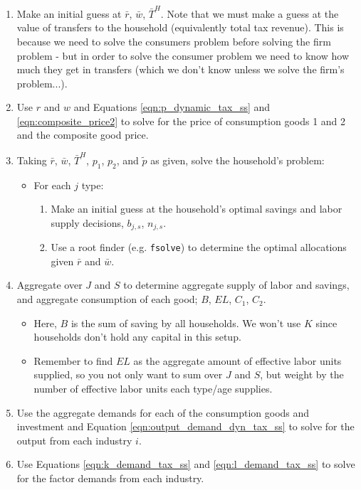\documentclass[letterpaper,12pt]{article}
\theoremstyle{definition}
\begin{document}
\begin{spacing}{1.5}
\begin{enumerate}
\item Make an initial guess at $\bar{r}$, $\bar{w}$, $\bar{T}^{H}$.  Note that we must make a guess at the value of transfers to the household (equivalently total tax revenue).  This is because we need to solve the consumers problem before solving the firm problem - but in order to solve the consumer problem we need to know how much they get in transfers (which we don't know unless we solve the firm's problem...).
\item Use $r$ and $w$ and Equations \ref{eqn:p_dynamic_tax_ss} and \ref{eqn:composite_price2} to solve for the price of consumption goods 1 and 2 and the composite good price.
\item Taking $\bar{r}$, $\bar{w}$, $\bar{T}^{H}$, $p_{1}$, $p_{2}$, and $\tilde{p}$ as given, solve the household's problem:
	\begin{itemize}
	\item For each $j$ type:
		\begin{enumerate}
		\item Make an initial guess at the household's optimal savings and labor supply decisions, $b_{j,s}$, $n_{j,s}$.
		\item Use a root finder (e.g. \texttt{fsolve}) to determine the optimal allocations given $\bar{r}$ and $\bar{w}$.
		\end{enumerate}
	\end{itemize}
\item Aggregate over $J$ and $S$ to determine aggregate supply of labor and savings, and aggregate consumption of each good; $B$, $EL$, $C_{1}$, $C_{2}$.
	\begin{itemize}
	\item Here, $B$ is the sum of saving by all households.  We won't use $K$ since households don't hold any capital in this setup.
	\item Remember to find $EL$ as the aggregate amount of effective labor units supplied, so you not only want to sum over $J$ and $S$, but weight by the number of effective labor units each type/age supplies.
	\end{itemize}
\item Use the aggregate demands for each of the consumption goods and investment and Equation \ref{eqn:output_demand_dyn_tax_ss} to solve for the output from each industry $i$.
\item Use Equations \ref{eqn:k_demand_tax_ss} and \ref{eqn:l_demand_tax_ss} to solve for the factor demands from each industry.

\end{enumerate}
\end{spacing}
\end{document}
